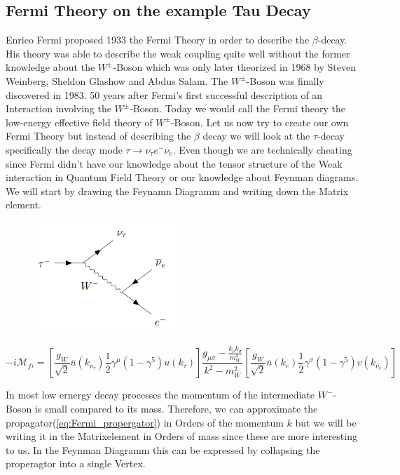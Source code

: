 \documentclass[../Bachelorarbeit.tex]{subfiles}
\begin{document}
\subsection{Fermi Theory on the example Tau Decay}
\label{sec:Fermi}
Enrico Fermi proposed 1933 the Fermi Theory in order to describe the $\beta$-decay. His theory was able to describe the
weak coupling quite well without the former knowledge about the $W^{\pm}$-Boson which was only later theorized in 1968 by Steven Weinberg, Sheldon Glashow and Abdus Salam.
The $W^{\pm}$-Boson was finally discovered in 1983. 50 years after Fermi's first successful description of an Interaction involving the $W^{\pm}$-Boson.
Today we would call the Fermi theory the low-energy effective field theory of $W^{\pm}$-Boson.
Let us now try to create our own Fermi Theory but instead of describing the $\beta$ decay we will look at the $\tau$-decay specifically the decay mode $\tau \rightarrow \nu_{\tau}e^{-}\nu_{e}$.
Even though we are technically cheating since Fermi didn't have our knowledge about the tensor structure of the Weak interaction in Quantum Field Theory or our knowledge about Feynman diagrams.
We will start by drawing the Feynamn Diagramm and writing down the Matrix element.
\begin{figure}[h]
    \centering
    \includegraphics[width=0.5\textwidth]{images/Feynamn_tau_decay.PNG}
\end{figure}

\begin{equation}
    -i\mathcal{M}_{fi}= \left[ \frac{g_{W}}{\sqrt{2}} \overline{u}(k_{\nu_{\tau}})\frac{1}{2}\gamma^{\mu}(1-\gamma^{5})u(k_{\tau}) \right] \frac{g_{\mu\sigma}-\frac{k_{\nu}k_{\sigma}}{m_{W}^{2}}}{k^{2}-m_{W}^{2}} \left[ \frac{g_{W}}{\sqrt{2}} \overline{u}(k_{e})\frac{1}{2}\gamma^{\sigma}(1-\gamma^{5})v(k_{\overline{\nu_{e}}}) \right]
\end{equation}

In most low ernergy decay processes the momentum of the intermediate $W^{-}$-Boson is small compared to its mass. Therefore, we can approximate the
propagator(\ref{eq:Fermi_propergator}) in Orders of the momentum $k$ but we will be writing it in the Matrixelement in Orders
of mass since these are more interesting to us. In the Feynman Diagramm this can be expressed by collapsing the properagtor into a single Vertex.
\end{document}
